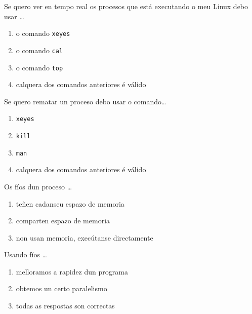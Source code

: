 \begin{diapo}\begin{frame}{ Se quero ver en tempo real os procesos que está executando o meu Linux debo usar \dots}
\begin{enumerate}
	\item  o comando \texttt{xeyes}
	\pause
	\item o comando \texttt{cal}
	\pause
	\item  o comando \texttt{top}
	\pause
	\item   calquera dos comandos anteriores é válido
\end{enumerate} 
\end{frame} 
\end{diapo} 
\begin{diapo}\begin{frame}{ Se quero rematar un proceso debo usar o comando\dots}
\begin{enumerate}
	\item   \texttt{xeyes}
	\pause
	\item \texttt{kill}
	\pause
	\item   \texttt{man}
	\pause
	\item   calquera dos comandos anteriores é válido
\end{enumerate} 
\end{frame} 
\end{diapo} 


\begin{diapo} \begin{frame}{ Os fíos dun proceso   \dots} 
\begin{enumerate}
	\item teñen cadanseu espazo de memoria\pause
	\item comparten espazo de memoria \pause
	\item non usan memoria, execútanse directamente 
\end{enumerate} \end{frame}  \end{diapo}  
\begin{diapo}\begin{frame}{ Usando fíos   \dots}
\begin{enumerate}
	\item melloramos a rapidez dun programa \pause
	\item obtemos un certo paralelismo \pause
	\item todas as respostas son correctas 
\end{enumerate} \end{frame} \end{diapo}



